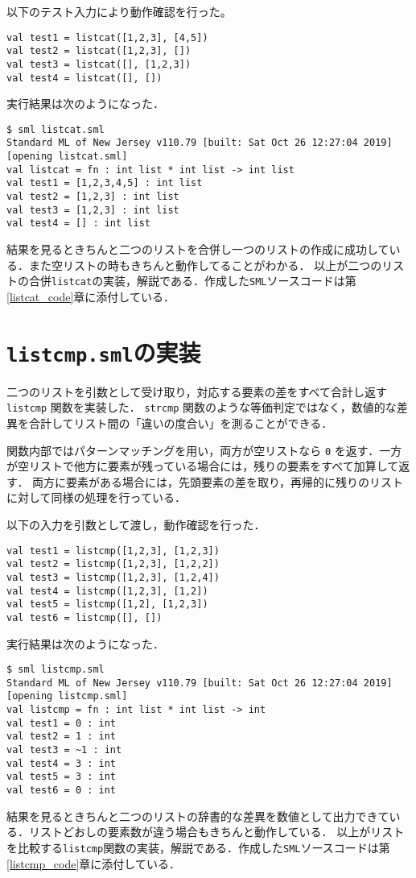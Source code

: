 \documentclass[autodetect-engine,dvi=dvipdfmx,ja=standard,
               a4j,11pt]{bxjsarticle}
\begin{document}
以下のテスト入力により動作確認を行った。

\begin{Verbatim}
val test1 = listcat([1,2,3], [4,5])
val test2 = listcat([1,2,3], [])
val test3 = listcat([], [1,2,3])
val test4 = listcat([], [])    
\end{Verbatim}
実行結果は次のようになった．
\begin{Verbatim}
$ sml listcat.sml 
Standard ML of New Jersey v110.79 [built: Sat Oct 26 12:27:04 2019]
[opening listcat.sml]
val listcat = fn : int list * int list -> int list
val test1 = [1,2,3,4,5] : int list
val test2 = [1,2,3] : int list
val test3 = [1,2,3] : int list
val test4 = [] : int list   
\end{Verbatim}
結果を見るときちんと二つのリストを合併し一つのリストの作成に成功している．また空リストの時もきちんと動作してることがわかる．
以上が二つのリストの合併\verb|listcat|の実装，解説である．作成した\verb|SML|ソースコードは第\ref{listcat_code}章に添付している．
\section{\texttt{listcmp.sml}の実装}
二つのリストを引数として受け取り，対応する要素の差をすべて合計し返す \verb|listcmp| 関数を実装した．
\verb|strcmp| 関数のような等価判定ではなく，数値的な差異を合計してリスト間の「違いの度合い」を測ることができる．

関数内部ではパターンマッチングを用い，両方が空リストなら \verb|0| を返す．一方が空リストで他方に要素が残っている場合には，残りの要素をすべて加算して返す．
両方に要素がある場合には，先頭要素の差を取り，再帰的に残りのリストに対して同様の処理を行っている．

以下の入力を引数として渡し，動作確認を行った．
\begin{Verbatim}
val test1 = listcmp([1,2,3], [1,2,3])
val test2 = listcmp([1,2,3], [1,2,2])
val test3 = listcmp([1,2,3], [1,2,4])
val test4 = listcmp([1,2,3], [1,2])
val test5 = listcmp([1,2], [1,2,3])
val test6 = listcmp([], [])    
\end{Verbatim}
実行結果は次のようになった．
\begin{Verbatim}
$ sml listcmp.sml 
Standard ML of New Jersey v110.79 [built: Sat Oct 26 12:27:04 2019]
[opening listcmp.sml]
val listcmp = fn : int list * int list -> int
val test1 = 0 : int
val test2 = 1 : int
val test3 = ~1 : int
val test4 = 3 : int
val test5 = 3 : int
val test6 = 0 : int    
\end{Verbatim}
結果を見るときちんと二つのリストの辞書的な差異を数値として出力できている．リストどおしの要素数が違う場合もきちんと動作している．
以上がリストを比較する\verb|listcmp|関数の実装，解説である．作成した\verb|SML|ソースコードは第\ref{listcmp_code}章に添付している．
\end{document}
